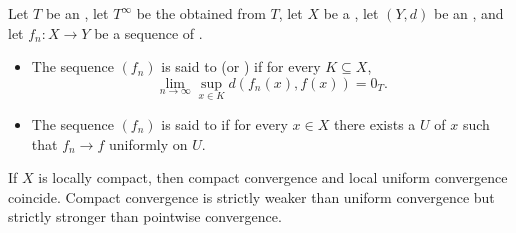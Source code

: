 \begin{definition} \label{definition:local_and_compact_uniform_convergence_of_sequences_of_functions}
    Let $T$ be an , let $T^\infty$ be the  obtained from $T$, let $X$ be a , let $(Y, d)$ be an , and let $f_n : X \to Y$ be a sequence of .

    \begin{itemize}
        \item The sequence $(f_n)$ is said to  (or ) if for every  $K \subseteq X$,
        $$\lim_{n \to \infty} \sup_{x \in K} d(f_n(x), f(x)) = 0_T.$$

        \item The sequence $(f_n)$ is said to  if for every $x \in X$ there exists a  $U$ of $x$ such that $f_n \to f$ uniformly on $U$.
    \end{itemize}

    If $X$ is locally compact, then compact convergence and local uniform convergence coincide. Compact convergence is strictly weaker than uniform convergence but strictly stronger than pointwise convergence.
\end{definition}